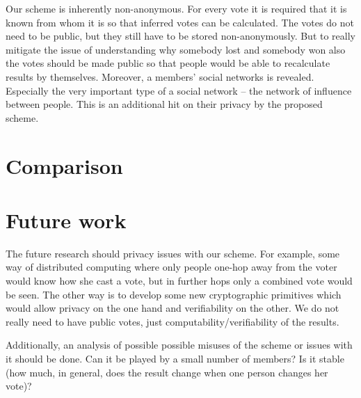 \documentclass[a4paper]{acm_proc_article-sp}
\begin{document}
Our scheme is inherently non-anonymous. For every vote it is required that it is known from whom it is so that inferred votes can be calculated. The votes do not need to be public, but they still have to be stored non-anonymously. But to really mitigate the issue of understanding why somebody lost and somebody won also the votes should be made public so that people would be able to recalculate results by themselves. Moreover, a members' social networks is revealed. Especially the very important type of a social network -- the network of influence between people. This is an additional hit on their privacy by the proposed scheme.


\section{Comparison}


\section{Future work}

The future research should privacy issues with our scheme. For example, some way of distributed computing where only people one-hop away from the voter would know how she cast a vote, but in further hops only a combined vote would be seen. The other way is to develop some new cryptographic primitives which would allow privacy on the one hand and verifiability on the other. We do not really need to have public votes, just computability/verifiability of the results.

Additionally, an analysis of possible possible misuses of the scheme or issues with it should be done. Can it be played by a small number of members? Is it stable (how much, in general, does the result change when one person changes her vote)?






%
\end{document}
